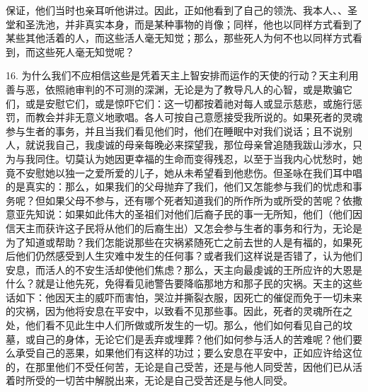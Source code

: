 保证，他们当时也亲耳听他讲过。因此，正如他看到了自己的领洗、我本人、、圣堂和圣洗池，并非真实本身，而是某种事物的肖像；同样，他也以同样方式看到了某些其他活着的人，而这些活人毫无知觉；那么，那些死人为何不也以同样方式看到，而这些死人毫无知觉呢？\par

16. 为什么我们不应相信这些是凭着天主上智安排而运作的天使的行动？天主利用善与恶，依照祂审判的不可测的深渊，无论是为了教导凡人的心智，或是欺骗它们，或是安慰它们，或是惊吓它们：这一切都按着祂对每人或显示慈悲，或施行惩罚，而教会并非无意义地歌唱。各人可按自己意愿接受我所说的。如果死者的灵魂参与生者的事务，并且当我们看见他们时，他们在睡眠中对我们说话；且不说别人，就说我自己，我虔诚的母亲每晚必来探望我，那位母亲曾追随我跋山涉水，只为与我同住。切莫认为她因更幸福的生命而变得残忍，以至于当我内心忧愁时，她竟不安慰她以独一之爱所爱的儿子，她从未希望看到他悲伤。但圣咏在我们耳中唱的是真实的：那么，如果我们的父母抛弃了我们，他们又怎能参与我们的忧虑和事务呢？但如果父母不参与，还有哪个死者知道我们的所作所为或所受的苦呢？依撒意亚先知说：如果如此伟大的圣祖们对他们后裔子民的事一无所知，他们（他们因信天主而获许这子民将从他们的后裔生出）又怎会参与生者的事务和行为，无论是为了知道或帮助？我们怎能说那些在灾祸紧随死亡之前去世的人是有福的，如果死后他们仍然感受到人生灾难中发生的任何事？或者我们这样说是否错了，认为他们安息，而活人的不安生活却使他们焦虑？那么，天主向最虔诚的王所应许的大恩是什么？就是让他先死，免得看见祂警告要降临那地方和那子民的灾祸。天主的这些话如下：他因天主的威吓而害怕，哭泣并撕裂衣服，因死亡的催促而免于一切未来的灾祸，因为他将安息在平安中，以致看不见那些事。因此，死者的灵魂所在之处，他们看不见此生中人们所做或所发生的一切。那么，他们如何看见自己的坟墓，或自己的身体，无论它们是丢弃或埋葬？他们如何参与活人的苦难呢？他们要么承受自己的恶果，如果他们有这样的功过；要么安息在平安中，正如应许给这位的，在那里他们不受任何苦，无论是自己受苦，还是与他人同受苦，因他们已从活着时所受的一切苦中解脱出来，无论是自己受苦还是与他人同受。\par

